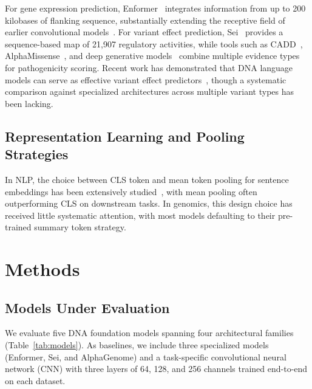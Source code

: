 \documentclass{article}
\begin{document}
For gene expression prediction, Enformer~\citep{avsec_2021_enformer} integrates
information from up to 200 kilobases of flanking sequence, substantially
extending the receptive field of earlier convolutional
models~\citep{kelley_2018_basenji, kelley_2020_basenji2}. For variant effect
prediction, Sei~\citep{chen_2022_sei} provides a sequence-based map of 21,907
regulatory activities, while tools such as CADD~\citep{kircher_2014_cadd},
AlphaMissense~\citep{cheng_2023_accurate}, and deep generative
models~\citep{frazer_2021_disease} combine multiple evidence types for
pathogenicity scoring. Recent work has demonstrated that DNA language models
can serve as effective variant effect predictors~\citep{benegas_2023_dnabert_survey},
though a systematic comparison against specialized architectures across multiple
variant types has been lacking.

\subsection{Representation Learning and Pooling Strategies}

In NLP, the choice between CLS token and mean token pooling for sentence
embeddings has been extensively studied~\citep{devlin_2019_bert}, with mean
pooling often outperforming CLS on downstream tasks. In genomics, this design
choice has received little systematic attention, with most models defaulting
to their pre-trained summary token strategy.

\section{Methods}
\label{sec:methods}

\subsection{Models Under Evaluation}

We evaluate five DNA foundation models spanning four architectural families
(Table~\ref{tab:models}). As baselines, we include three specialized models
(Enformer, Sei, and AlphaGenome) and a task-specific convolutional neural
network (CNN) with three layers of 64, 128, and 256 channels trained
end-to-end on each dataset.
\end{document}
